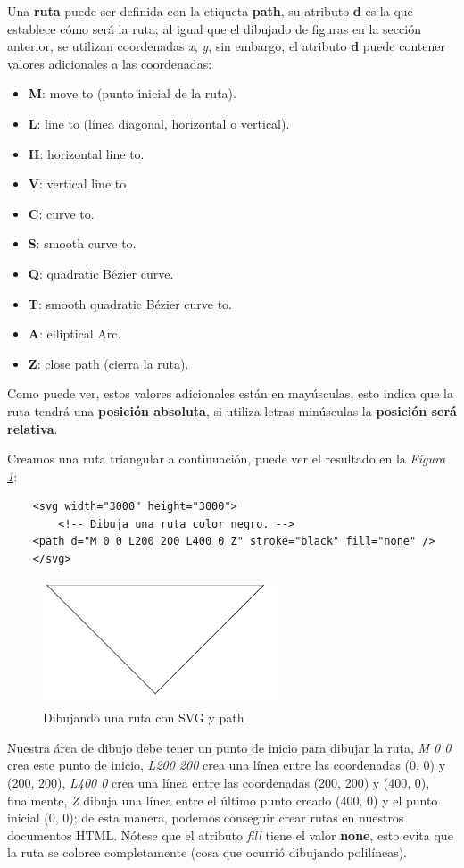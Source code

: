 Una \textbf{ruta} puede ser definida con la etiqueta \textbf{path}, su atributo \textbf{d} es la que establece cómo será la ruta; al igual que el dibujado de figuras en la sección anterior, se utilizan coordenadas \textit{x}, \textit{y}, sin embargo, el atributo \textbf{d} puede contener valores adicionales a las coordenadas:
\begin{itemize}
    \item \textbf{M}: move to (punto inicial de la ruta).
    \item \textbf{L}: line to (línea diagonal, horizontal o vertical).
    \item \textbf{H}: horizontal line to.
    \item \textbf{V}: vertical line to
    \item \textbf{C}: curve to.
    \item \textbf{S}: smooth curve to.
    \item \textbf{Q}: quadratic Bézier curve.
    \item \textbf{T}: smooth quadratic Bézier curve to.
    \item \textbf{A}: elliptical Arc.
    \item \textbf{Z}: close path (cierra la ruta).
\end{itemize}

Como puede ver, estos valores adicionales están en mayúsculas, esto indica que la ruta tendrá una \textbf{posición absoluta}, si utiliza letras minúsculas la \textbf{posición será relativa}.

Creamos una ruta triangular a continuación, puede ver el resultado en la \textit{Figura \ref{fig: 26}}:
\begin{lstlisting}
    <svg width="3000" height="3000">
        <!-- Dibuja una ruta color negro. -->
   	<path d="M 0 0 L200 200 L400 0 Z" stroke="black" fill="none" />
    </svg>
\end{lstlisting}
\begin{figure}[H]
    \centering
    \caption{Dibujando una ruta con SVG y path}
    \label{fig: 26}
    \includegraphics[width=7cm]{ss_html/svg_path.png}
\end{figure}

Nuestra área de dibujo debe tener un punto de inicio para dibujar la ruta, \textit{M 0 0} crea este punto de inicio, \textit{L200 200} crea una línea entre las coordenadas (0, 0) y (200, 200), \textit{L400 0} crea una línea entre las coordenadas (200, 200) y (400, 0), finalmente, \textit{Z} dibuja una línea entre el último punto creado (400, 0) y el punto inicial (0, 0); de esta manera, podemos conseguir crear rutas en nuestros documentos HTML. Nótese que el atributo \textit{fill} tiene el valor \textbf{none}, esto evita que la ruta se coloree completamente (cosa que ocurrió dibujando polilíneas).

